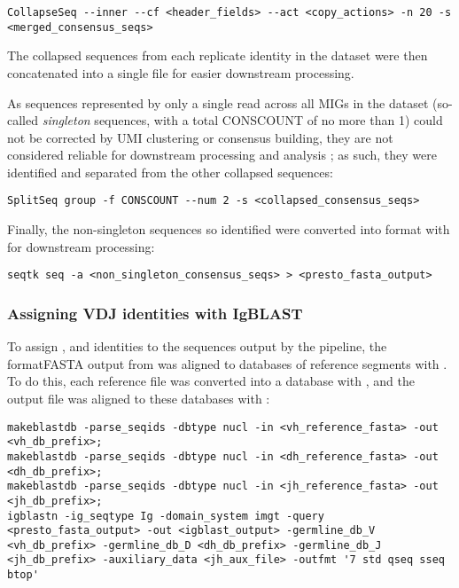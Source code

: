 \begin{lstlisting}
CollapseSeq --inner --cf <header_fields> --act <copy_actions> -n 20 -s <merged_consensus_seqs>
\end{lstlisting}

\noindent The collapsed sequences from each replicate identity in the dataset were then concatenated into a single file for easier downstream processing. 

As sequences represented by only a single read across all MIGs in the dataset (so-called \textit{singleton} sequences, with a total CONSCOUNT of no more than 1) could not be corrected by UMI clustering or consensus building, they are not considered reliable for downstream processing and analysis \parencite{vanderheiden2018perscomm}; as such, they were identified and separated from the other collapsed sequences:

\begin{lstlisting}
SplitSeq group -f CONSCOUNT --num 2 -s <collapsed_consensus_seqs>
\end{lstlisting}

\noindent Finally, the non-singleton sequences so identified were converted into  format with  \parencite{li2016seqtk} for downstream processing:

\begin{lstlisting}
seqtk seq -a <non_singleton_consensus_seqs> > <presto_fasta_output>
\end{lstlisting}

\subsubsection{Assigning VDJ identities with IgBLAST}
\label{sec:methods_comp_igpreproc_igblast}

To assign \vh, \dh and \jh identities to the sequences output by the  pipeline, the format{FASTA} output from  was aligned to databases of reference segments with  \parencite{ye2013igblast}. To do this, each reference file was converted into a  database with , and the output  file was aligned to these databases with :

\begin{lstlisting}
makeblastdb -parse_seqids -dbtype nucl -in <vh_reference_fasta> -out <vh_db_prefix>;
makeblastdb -parse_seqids -dbtype nucl -in <dh_reference_fasta> -out <dh_db_prefix>;
makeblastdb -parse_seqids -dbtype nucl -in <jh_reference_fasta> -out <jh_db_prefix>;
igblastn -ig_seqtype Ig -domain_system imgt -query <presto_fasta_output> -out <igblast_output> -germline_db_V <vh_db_prefix> -germline_db_D <dh_db_prefix> -germline_db_J <jh_db_prefix> -auxiliary_data <jh_aux_file> -outfmt '7 std qseq sseq btop'
\end{lstlisting}

